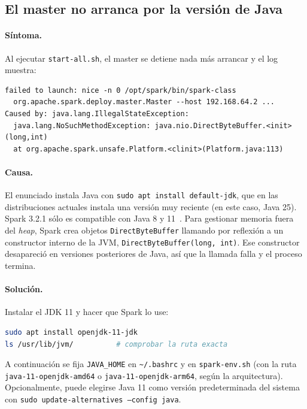 \documentclass[11pt,a4paper]{article}
\begin{document}
\subsection{El master no arranca por la versión de Java}
\label{sec:problema-java}

\paragraph{Síntoma.} Al ejecutar \texttt{start-all.sh}, el master se detiene nada más arrancar y el log muestra:
\begin{lstlisting}
failed to launch: nice -n 0 /opt/spark/bin/spark-class
  org.apache.spark.deploy.master.Master --host 192.168.64.2 ...
Caused by: java.lang.IllegalStateException:
  java.lang.NoSuchMethodException: java.nio.DirectByteBuffer.<init>(long,int)
  at org.apache.spark.unsafe.Platform.<clinit>(Platform.java:113)
\end{lstlisting}

\paragraph{Causa.} El enunciado instala Java con \texttt{sudo apt install default-jdk}, que en las distribuciones actuales instala una versión muy reciente (en este caso, Java 25). Spark 3.2.1 sólo es compatible con Java 8 y 11~\cite{spark-overview}. Para gestionar memoria fuera del \emph{heap}, Spark crea objetos \texttt{DirectByteBuffer} llamando por reflexión a un constructor interno de la JVM, \texttt{DirectByteBuffer(long, int)}. Ese constructor desapareció en versiones posteriores de Java, así que la llamada falla y el proceso termina.

\paragraph{Solución.} Instalar el JDK 11 y hacer que Spark lo use:
\begin{lstlisting}[language=bash]
sudo apt install openjdk-11-jdk
ls /usr/lib/jvm/          # comprobar la ruta exacta
\end{lstlisting}
\begin{sloppypar}
A continuación se fija \texttt{JAVA\_HOME} en \texttt{\textasciitilde/.bashrc} y en \texttt{spark-env.sh} (con la ruta \texttt{java-11-openjdk-amd64} o \texttt{java-11-openjdk-arm64}, según la arquitectura). Opcionalmente, puede elegirse Java 11 como versión predeterminada del sistema con \texttt{sudo update-alternatives --config java}.
\end{sloppypar}
\end{document}
